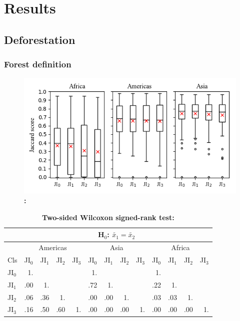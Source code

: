 \chapter{Results}
\label{ch:result}

	\section{Deforestation}
	\label{sec:deforestation}

		\subsection{Forest definition}
		\label{subsec:forest_definition}
			\begin{figure}[ht]
				\centering
				\includegraphics[scale=1]{img/jaccard}
				\caption[]{\textbf{:} }
				\label{fig:jaccard}
			\end{figure}
			\begin{table}[ht]
				\centering
				\caption[Two-sided Wilcoxon signed-rank test]{\textbf{Two-sided Wilcoxon signed-rank test:}}
				\label{tab:wilcoxontwosided}
				\begin{tabular}{lrrrrrrrrrrrr}
					\hline
					& \multicolumn{12}{c}{H$_0$: $\tilde{x_1}=\tilde{x_2}$} \\\hline
					& \multicolumn{4}{c}{Americas} & \multicolumn{4}{c}{Asia} & \multicolumn{4}{c}{Africa} \\
					Cls & JI$_0$ & JI$_1$ & JI$_2$ & JI$_3$ & JI$_0$ & JI$_1$ & JI$_2$ & JI$_3$ & JI$_0$ & JI$_1$ & JI$_2$ & JI$_3$ \\\hline
					JI$_0$ & 1. &  &  &  & 1. &  &  &  & 1. &  &  & \\
					JI$_1$ & .00 & 1. &  &  & .72 & 1. &  &  & .22 & 1. &  & \\
					JI$_2$ & .06 & .36 & 1. &  & .00 & .00 & 1. &  & .03 & .03 & 1. & \\
					JI$_3$ & .16 & .50 & .60 & 1. & .00 & .00 & .00 & 1. & .00 & .00 & .00 & 1. \\\hline
				\end{tabular}
			\end{table}
